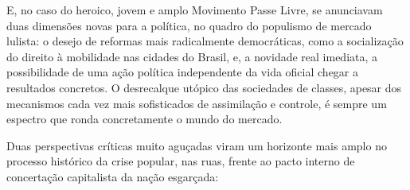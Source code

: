 E, no caso do heroico, jovem e amplo Movimento Passe Livre, se
anunciavam duas dimensões novas para a política, no quadro do populismo
de mercado lulista: o desejo de reformas mais radicalmente democráticas,
como a socialização do direito à mobilidade nas cidades do Brasil, e, a
novidade real imediata, a possibilidade de uma ação política
independente da vida oficial chegar a resultados concretos. O
desrecalque utópico das sociedades de classes, apesar dos mecanismos
cada vez mais sofisticados de assimilação e controle, é sempre um
espectro que ronda concretamente o mundo do mercado.

Duas perspectivas críticas muito aguçadas viram um horizonte mais amplo
no processo histórico da crise popular, nas ruas, frente ao pacto
interno de concertação capitalista da nação esgarçada:

